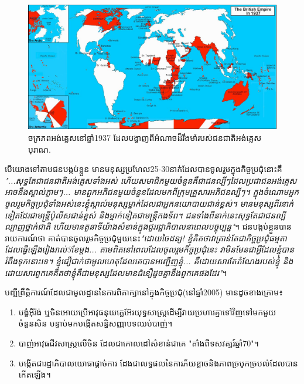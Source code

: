 \documentclass[10pt,twocolumn,letterpaper]{article}
\begin{document}
\begin{figure}[t]
\begin{center}
\includegraphics[width=1\textwidth]{british.jpg}
\end{center}
   \caption{ចក្រភពអង់គ្លេសនៅឆ្នាំ1937 ដែលបង្ហាញពីអំណាចដ៏រឹងមាំរបស់ជនជាតិអង់គ្លេសបុរាណ\cite{14}.}
   \label{fig:2}
\end{figure}
	បើយោងទៅតាមជនបង្កប់ខ្លួន មានមនុស្សប្រហែល25-30នាក់ដែលបានចូលរួមក្នុងកិច្ចប្រជុំនោះគឺ \textit{"...សុទ្ធតែជាជនជាតិអង់គ្លេសទាំងអស់ ហើយសមាជិកមួយចំនួនគឺជាជនល្បីៗដែលប្រជាជនអង់គ្លេសអាចនឹងស្គាល់ភ្លាមៗ... មានពួកអភិជនមួយចំនួនដែលមកពីក្រុមគ្រួសារអភិជនល្បីៗ។ ក្នុងចំណោមអ្នកចូលរួមកិច្ចប្រជុំទាំងអស់នេះ​ ខ្ញុំស្គាល់មនុស្សម្នាក់ដែលជាអ្នកនយោបាយជាន់ខ្ពស់។ មានមនុស្សពីរនាក់ទៀតដែរជាមន្ត្រីប៉ូលីសជាន់ខ្ពស់ និងម្នាក់ទៀតជាមន្ត្រីកងទ័ព។ ជនទាំងពីនាក់នេះសុទ្ធតែជាជនល្បីល្បាញថ្នាក់ជាតិ ហើយមានតួនាទីយ៉ាងសំខាន់ក្នុងជួររដ្ឋាភិបាលនាពេលបច្ចុប្បន្ន"}\cite{4}។ ជនបង្កប់ខ្លួនបានរាយការណ៍ថា គាត់បានចូលរួមកិច្ចប្រជុំមួយនេះ\textit {"ដោយចៃដន្យ! ខ្ញុំគិតថាវាគ្រាន់តែជាកិច្ចប្រជុំធម្មតាដែលធ្វើឡើងរៀងរាល់3ខែម្តង... តាមពិតនៅពេលដែលចូលរួមកិច្ចប្រជុំនេះ វាមិនមែនជាអ្វីដែលខ្ញុំ​បានរំពឹងទុកនោះទេ។ ខ្ញុំជឿជាក់ថាមូលហេតុដែលគេបានអញ្ជើញខ្ញុំ... គឺដោយសារតែតំណែងរបស់ខ្ញុំ និងដោយសារពួកគេគិតថាខ្ញុំគឺជាមនុស្សដែលមានជំនឿដូចគ្នានឹងពួកគេផងដែរ"}\cite{4}។

បញ្ជីព្រឹត្តិការណ៍ដែលជាមូលដ្ឋាននៃការពិភាក្សានៅក្នុងកិច្ចប្រជុំ(នៅឆ្នាំ2005) មានដូចខាងក្រោម៖

\begin{flushleft}
\begin{enumerate}
    \item បង្ខំអុីរ៉ង់ ឬចិនអោយប្រើអាវុធនុយក្លេអ៊ែរយុទ្ធសាស្ត្រដើម្បីវាយប្រហារគ្នាទៅវិញទៅមកមួយចំនួនសិន បន្ទាប់មកបង្កើតសន្ធិសញ្ញាបទឈប់បាញ់។
    \item បាញ់អាវុធជីវសាស្ត្រលើចិន ដែលជាគោលដៅសំខាន់ជាគេ "តាំងពីទសវត្សរ៍ឆ្នាំ70"។
    \item បង្កើតជារដ្ឋាភិបាលយោធាផ្តាច់ការ ដែងជាលទ្ធផលនៃការភ័យខ្លាចនិងភាពច្របូកច្របល់ដែលបានកើតឡើង។
\end{enumerate}
\end{flushleft}
\end{document}
